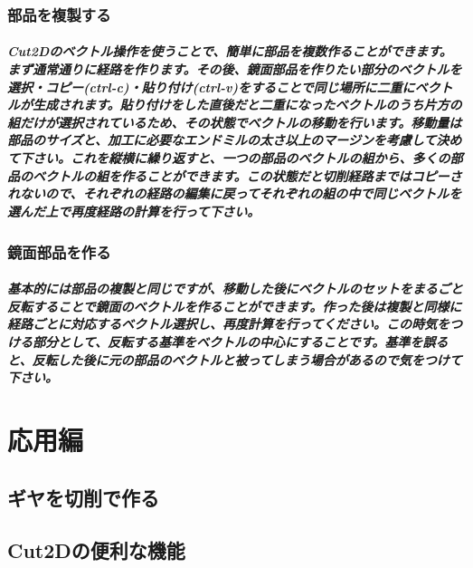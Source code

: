 \documentclass[b5paper, 9pt, twocolumn, titlepage,openany]{jsbook}%
\begin{document}
\subsection{部品を複製する}
\paragraph{Cut2Dのベクトル操作を使うことで、簡単に部品を複数作ることができます。まず通常通りに経路を作ります。その後、鏡面部品を作りたい部分のベクトルを選択・コピー(ctrl-c)・貼り付け(ctrl-v)をすることで同じ場所に二重にベクトルが生成されます。貼り付けをした直後だと二重になったベクトルのうち片方の組だけが選択されているため、その状態でベクトルの移動を行います。移動量は部品のサイズと、加工に必要なエンドミルの太さ以上のマージンを考慮して決めて下さい。これを縦横に繰り返すと、一つの部品のベクトルの組から、多くの部品のベクトルの組を作ることができます。この状態だと切削経路まではコピーされないので、それぞれの経路の編集に戻ってそれぞれの組の中で同じベクトルを選んだ上で再度経路の計算を行って下さい。}
\subsection{鏡面部品を作る}
\paragraph{基本的には部品の複製と同じですが、移動した後にベクトルのセットをまるごと反転することで鏡面のベクトルを作ることができます。作った後は複製と同様に経路ごとに対応するベクトル選択し、再度計算を行ってください。この時気をつける部分として、反転する基準をベクトルの中心にすることです。基準を誤ると、反転した後に元の部品のベクトルと被ってしまう場合があるので気をつけて下さい。}

\chapter{応用編}
\section{ギヤを切削で作る }
\section{Cut2Dの便利な機能}



\end{document}
